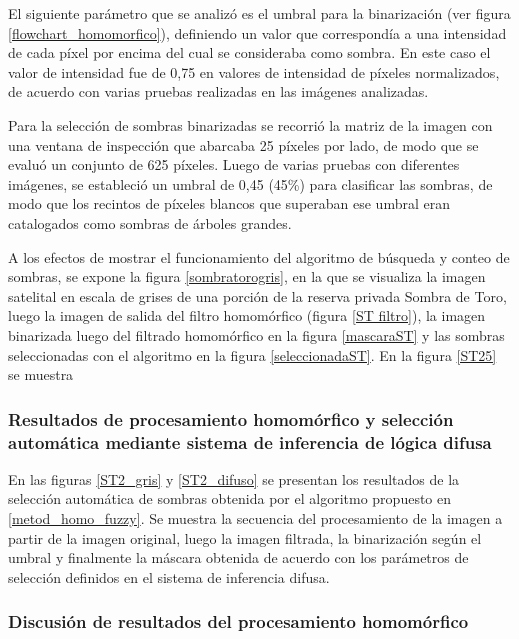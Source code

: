 El siguiente parámetro que se analizó es el umbral para la binarización (ver figura \ref{flowchart_homomorfico}), definiendo un valor que correspondía a una intensidad de cada píxel por encima del cual se consideraba como sombra. En este caso el valor de intensidad fue de 0,75 en valores de intensidad de píxeles normalizados, de acuerdo con varias pruebas realizadas en las imágenes analizadas.

Para la selección de sombras binarizadas se recorrió la matriz de la imagen con una ventana de inspección que abarcaba 25 píxeles por lado, de modo que se evaluó un conjunto de 625 píxeles. Luego de varias pruebas con diferentes imágenes, se estableció un umbral de 0,45 (45\%) para clasificar las sombras, de modo que los recintos de píxeles blancos que superaban ese umbral eran catalogados como sombras de árboles grandes.

A los efectos de mostrar el funcionamiento del algoritmo de búsqueda y conteo de sombras, se expone la figura \ref{sombratorogris}, en la que se visualiza la imagen satelital en escala de grises de una porción de la reserva privada Sombra de Toro, luego la imagen de salida del filtro homomórfico (figura \ref{ST filtro}), la imagen binarizada luego del filtrado homomórfico en la figura \ref{mascaraST} y las sombras seleccionadas con el algoritmo en la figura \ref{seleccionadaST}. En la figura \ref{ST25} se muestra



\subsubsection{Resultados de procesamiento homomórfico y selección automática mediante sistema de inferencia de lógica difusa} \label{resultados homo difusa}
En las figuras \ref{ST2_gris} y \ref{ST2_difuso} se presentan los resultados de la selección automática de sombras obtenida por el algoritmo propuesto en \ref{metod_homo_fuzzy}.
Se muestra la secuencia del procesamiento de la imagen a partir de la imagen original, luego la imagen filtrada, la binarización según el umbral y finalmente la máscara obtenida de acuerdo con los parámetros de selección definidos en el sistema de inferencia difusa.



\subsubsection{Discusión de resultados del procesamiento homomórfico}

